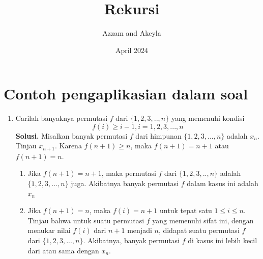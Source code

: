 \documentclass[11pt]{scrartcl}
\title{Rekursi}
\author{Azzam and Akeyla}
\date{April 2024}
\begin{document}
\maketitle

\renewcommand*\contentsname{Daftar Isi}
\tableofcontents

\newpage
\section{Contoh pengaplikasian dalam soal}
\begin{enumerate}
    \item Carilah banyaknya permutasi $f$ dari $\{1,2,3,..,n\}$ yang memenuhi kondisi $$f(i) \geq i - 1,   i=1,2,3,...,n$$
        \textbf{Solusi.} Misalkan banyak permutasi $f$ dari himpunan $\{1,2,3,...,n\}$ adalah $x_n$. Tinjau $x_{n+1}$. Karena $f(n+1) \geq n$, maka $f(n + 1) = n + 1$ atau $f(n + 1) = n$.
        \begin{enumerate}
            \item Jika $f(n + 1) = n + 1$, maka permutasi $f$ dari $\{1,2,3,..,n\}$ adalah $\{1,2,3,...,n\}$ juga. Akibatnya banyak permutasi $f$ dalam kasus ini adalah $x_n$
            \item Jika $f(n + 1) = n$, maka $f(i) = n + 1$ untuk tepat satu $1 \leq i \leq n$. Tinjau bahwa untuk suatu permutasi $f$ yang memenuhi sifat ini, dengan menukar nilai $f(i)$ dari $n + 1$ menjadi $n$, didapat suatu permutasi $f$ dari $\{1,2,3,...,n\}$.
            Akibatnya, banyak permutasi $f$ di kasus ini lebih kecil dari atau sama dengan $x_n$.
            

\end{enumerate}
\end{enumerate}
\end{document}
